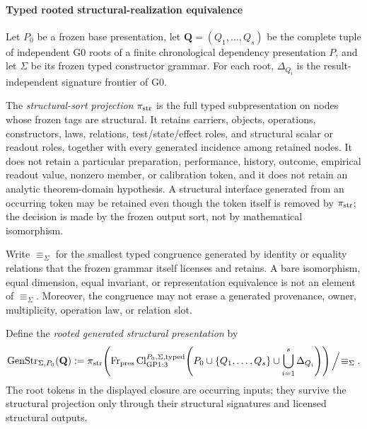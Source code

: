 \documentclass[12pt,a4paper]{article}
\begin{document}
\paragraph{Typed rooted structural-realization equivalence}
\label{p2a:subsec:typed-structural-geometrization}

\begin{definition}
\label{p2a:def:generated-realized-structural-presentations}
Let \(P_0\) be a frozen base presentation, let
\(\mathbf Q=(Q_1,\ldots,Q_s)\) be the complete tuple of independent G0 roots
of a finite chronological dependency presentation \(P\), and let \(\Sigma\)
be its frozen typed constructor grammar.  For each root, \(\Delta_{Q_i}\) is
the result-independent signature frontier of G0.

The \emph{structural-sort projection} \(\pi_{\rm str}\) is the full typed
subpresentation on nodes whose frozen tags are structural.  It retains
carriers, objects, operations, constructors, laws, relations, test/state/effect
roles, and structural scalar or readout roles, together with every generated
incidence among retained nodes.  It does not retain a particular preparation,
performance, history, outcome, empirical readout value, nonzero member, or
calibration token, and it does not retain an analytic theorem-domain
hypothesis.  A structural interface generated from an occurring token may be
retained even though the token itself is removed by \(\pi_{\rm str}\); the
decision is made by the frozen output sort, not by mathematical isomorphism.

Write \(\equiv_{\Sigma}\) for the smallest typed congruence generated by
identity or equality relations that the frozen grammar itself licenses and
retains.  A bare isomorphism, equal dimension, equal invariant, or
representation equivalence is not an element of \(\equiv_{\Sigma}\).
Moreover, the congruence may not erase a generated provenance, owner,
multiplicity, operation law, or relation slot.

Define the \emph{rooted generated structural presentation} by
\[
 \operatorname{GenStr}_{\Sigma,P_0}(\mathbf Q)
 :=
 \pi_{\rm str}\!\left(
  \operatorname{Fr}_{\rm pres}
  \operatorname{Cl}^{P_0,\Sigma,\rm typed}_{\rm GP1:3}
  \!\left(P_0\cup\{Q_1,\ldots,Q_s\}
                 \cup\bigcup_{i=1}^{s}\Delta_{Q_i}\right)
 \right)\Big/\!\equiv_{\Sigma}.
\]
The root tokens in the displayed closure are occurring inputs; they survive
the structural projection only through their structural signatures and
licensed structural outputs.


\end{definition}
\end{document}
